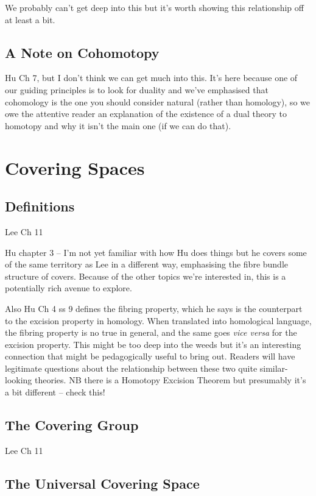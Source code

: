\documentclass[oneside,english]{amsbook}
\numberwithin{section}{chapter}
\theoremstyle{plain}
\theoremstyle{definition}
\begin{document}
	We probably can't get deep into this but it's worth showing this relationship off at least a bit.
	
	\section{A Note on Cohomotopy}
	
	Hu Ch 7, but I don't think we can get much into this. It's here because one of our guiding principles is to look for duality and we've emphasised that cohomology is the one you should consider natural (rather than homology), so we owe the attentive reader an explanation of the existence of a dual theory to homotopy and why it isn't the main one (if we can do that).	

	\chapter{Covering Spaces}
	
	\section{Definitions}
	
	Lee Ch 11
	
	Hu chapter 3 -- I'm not yet familiar with how Hu does things but he covers some of the same territory as Lee in a different way, emphasising the fibre bundle structure of covers. Because of the other topics we're interested in, this is a potentially rich avenue to explore.
	
	Also Hu Ch 4 ss 9 defines the fibring property, which he says is the counterpart to the excision property in homology. When translated into homological language, the fibring property is no true in general, and the same goes \emph{vice versa} for the excision property. This might be too deep into the weeds but it's an interesting connection that might be pedagogically useful to bring out. Readers will have legitimate questions about the relationship between these two quite similar-looking theories. NB there is a Homotopy Excision Theorem but presumably it's a bit different -- check this!

	\section{The Covering Group}
	
	Lee Ch 11
	
	\section{The Universal Covering Space}
	
\end{document}
